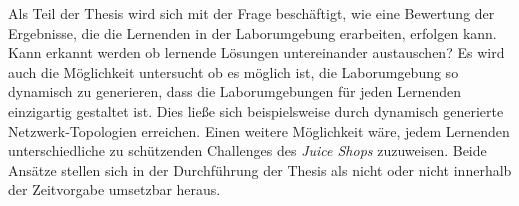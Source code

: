 Als Teil der Thesis wird sich mit der Frage beschäftigt, wie eine Bewertung der Ergebnisse, die die Lernenden in der Laborumgebung erarbeiten, erfolgen kann.
Kann erkannt werden ob lernende Lösungen untereinander austauschen?
Es wird auch die Möglichkeit untersucht ob es möglich ist, die Laborumgebung so dynamisch zu generieren, dass die Laborumgebungen für jeden Lernenden einzigartig gestaltet ist.
Dies ließe sich beispielsweise durch dynamisch generierte Netzwerk-Topologien erreichen.
Einen weitere Möglichkeit wäre, jedem Lernenden unterschiedliche zu schützenden Challenges des \textit{Juice Shops} zuzuweisen.
Beide Ansätze stellen sich in der Durchführung der Thesis als nicht oder nicht innerhalb der Zeitvorgabe umsetzbar heraus.\\

